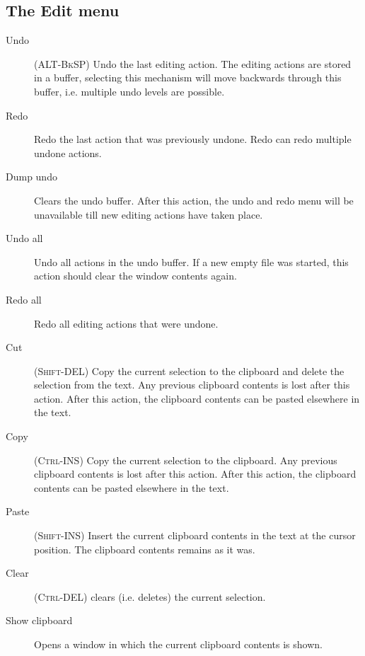 \subsection{The Edit menu}
\label{se:menuedit}
\begin{description}
\item[Undo] (\textsc{ALT-BkSP})
Undo the last editing action. The editing actions are stored in a buffer,
selecting this mechanism will move backwards through this buffer, i.e.
multiple undo levels are possible.
\item[Redo] Redo the last action that was previously undone. Redo can redo
multiple undone actions. 
\item[Dump undo]
Clears the undo buffer. After this action, the undo and redo menu will be 
unavailable till new editing actions have taken place.
\item[Undo all]
Undo all actions in the undo buffer. If a new empty file was started, this
action should clear the window contents again.
\item[Redo all]
Redo all editing actions that were undone.
\item[Cut] (\textsc{Shift-DEL}) Copy the current selection to the clipboard
and delete the selection from the text. Any previous clipboard contents is
lost after this action. After this action, the clipboard contents can be 
pasted elsewhere in the text.
\item[Copy] (\textsc{Ctrl-INS}) Copy the current selection to the clipboard.
Any previous clipboard contents is lost after this action. 
After this action, the clipboard contents can be pasted elsewhere in the text.
\item[Paste] (\textsc{Shift-INS}) Insert the current clipboard contents in
the text at the cursor position. The clipboard contents remains as it was.
\item[Clear] (\textsc{Ctrl-DEL}) clears (i.e. deletes) the current
selection.
\item[Show clipboard] Opens a window in which the current clipboard contents
is shown.
\end{description}
%
%
